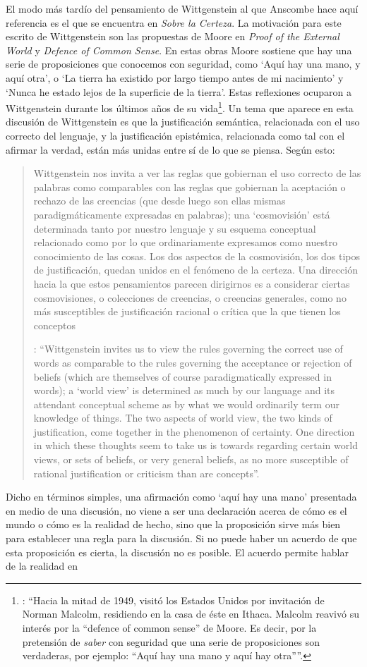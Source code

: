 El modo más tardío del pensamiento de Wittgenstein al que Anscombe hace aquí referencia es el que se encuentra en \emph{Sobre la Certeza}. La motivación para este escrito de Wittgenstein son las propuestas de Moore en \emph{Proof of the External World} y \emph{Defence of Common Sense}. En estas obras Moore sostiene que hay una serie de proposiciones que conocemos con seguridad, como \enquote*{Aquí hay una mano, y aquí otra}, o \enquote*{La tierra ha existido por largo tiempo antes de mi nacimiento} y \enquote*{Nunca he estado lejos de la superficie de la tierra}. Estas reflexiones ocuparon a Wittgenstein durante los últimos años de su vida\footnote{\cite[Cf.][vi]{wittgenstein1969oncertes}: \enquote{Hacia la mitad de 1949, visitó los Estados Unidos por invitación de Norman Malcolm, residiendo en la casa de éste en Ithaca. Malcolm reavivó su interés por la ``defence of common sense'' de Moore. Es decir, por la pretensión de \emph{saber} con seguridad que una serie de proposiciones son verdaderas, por ejemplo: ``Aquí hay una mano y aquí hay otra''}.}. Un tema que aparece en esta discusión de Wittgenstein es que la justificación semántica, relacionada con el uso correcto del lenguaje, y la justificación epistémica, relacionada como tal con el afirmar la verdad, están más unidas entre sí de lo que se piensa. Según esto:\blockquote[{\Cite[213]{teichmann2008ans}}: \enquote{Wittgenstein invites us to view the rules governing the correct use of words as comparable to the rules governing the acceptance or rejection of beliefs (which are themselves of course paradigmatically expressed in words); a ‘world view’ is determined as much by our language and its attendant conceptual scheme as by what we would ordinarily term our knowledge of things. The two aspects of world view, the two kinds of justification, come together in the phenomenon of certainty. \textelp{} One direction in which these thoughts seem to take us is towards regarding certain world views, or sets of beliefs, or very general beliefs, as no more susceptible of rational justification or criticism than are concepts}.]{Wittgenstein nos invita a ver las reglas que gobiernan el uso correcto de las palabras como comparables con las reglas que gobiernan la aceptación o rechazo de las creencias (que desde luego son ellas mismas paradigmáticamente expresadas en palabras); una `cosmovisión' está determinada tanto por nuestro lenguaje y su esquema conceptual relacionado como por lo que ordinariamente expresamos como nuestro conocimiento de las cosas. Los dos aspectos de la cosmovisión, los dos tipos de justificación, quedan unidos en el fenómeno de la certeza. \textelp{} Una dirección hacia la que estos pensamientos parecen dirigirnos es a considerar ciertas cosmovisiones, o colecciones de creencias, o creencias generales, como no más susceptibles de justificación racional o crítica que la que tienen los conceptos}. Dicho en términos simples, una afirmación como \enquote*{aquí hay una mano} presentada en medio de una discusión, no viene a ser una declaración acerca de cómo es el mundo o cómo es la realidad de hecho, sino que la proposición sirve más bien para establecer una regla para la discusión. Si no puede haber un acuerdo de que esta proposición es cierta, la discusión no es posible. El acuerdo permite hablar de la realidad en 